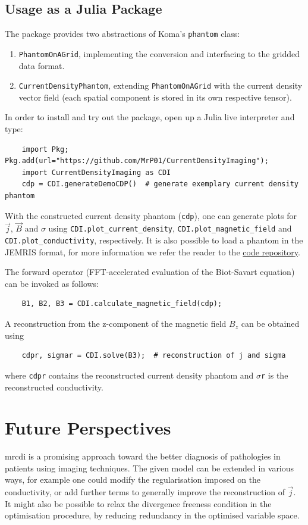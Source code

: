 \documentclass[10pt]{article}
\begin{document}
  \subsection{Usage as a Julia Package}
  The package provides two abstractions of Koma's \texttt{phantom} class:
  \begin{enumerate}
    \item \texttt{PhantomOnAGrid}, implementing the conversion and interfacing to the gridded data format.
    \item \texttt{CurrentDensityPhantom}, extending \texttt{PhantomOnAGrid} with the current density vector field (each spatial component is stored in its own respective tensor).
  \end{enumerate}

  In order to install and try out the package, open up a Julia live interpreter and type:
  \begin{verbatim}
    import Pkg; Pkg.add(url="https://github.com/MrP01/CurrentDensityImaging");
    import CurrentDensityImaging as CDI
    cdp = CDI.generateDemoCDP()  # generate exemplary current density phantom
  \end{verbatim}

  With the constructed current density phantom (\texttt{cdp}), one can generate plots for $\vec{j}$, $\vec{B}$ and $\sigma$ using
  \texttt{CDI.plot\_current\_density},
  \texttt{CDI.plot\_magnetic\_field} and
  \texttt{CDI.plot\_conductivity}, respectively.
  It is also possible to load a phantom in the JEMRIS format, for more information we refer the reader to the \href{https://github.com/MrP01/CurrentDensityImaging}{code repository}.

  The forward operator (FFT-accelerated evaluation of the Biot-Savart equation) can be invoked as follows:
  \begin{verbatim}
    B1, B2, B3 = CDI.calculate_magnetic_field(cdp);
  \end{verbatim}

  A reconstruction from the z-component of the magnetic field $B_z$ can be obtained using
  \begin{verbatim}
    cdpr, sigmar = CDI.solve(B3);  # reconstruction of j and sigma
  \end{verbatim}
  where \texttt{cdpr} contains the reconstructed current density phantom and $\sigma$\texttt{r} is the reconstructed conductivity.

  \section{Future Perspectives}
  \gls{mrcdi} is a promising approach toward the better diagnosis of pathologies in patients using imaging techniques.
  The given model can be extended in various ways, for example one could modify the regularisation imposed on the conductivity, or add further terms to generally improve the reconstruction of $\vec{j}$.
  It might also be possible to relax the divergence freeness condition in the optimisation procedure, by reducing redundancy in the optimised variable space.
\end{document}
